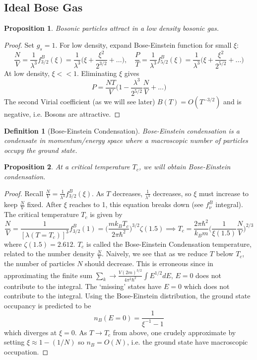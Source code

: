 \documentclass[a4paper]{article}
\theoremstyle{new}
\newtheorem{defi}{Definition}[section]
\newtheorem{prop}{Proposition}[section]
\begin{document}
\subsection{Ideal Bose Gas}
\begin{prop}
Bosonic particles attract in a low density bosonic gas.
\end{prop}
\begin{proof}
Set $g_s=1$. For low density, expand Bose-Einstein function for small $\xi$:
$$\frac{N}{V}=\frac{1}{\lambda^3}f_{3/2}^B(\xi)=\frac{1}{\lambda^3}\bigg(\xi+\frac{\xi^2}{2^{3/2}}+...\bigg),\quad \frac{P}{T}=\frac{1}{\lambda^3}f_{5/2}^B(\xi)=\frac{1}{\lambda^3}\bigg(\xi+\frac{\xi^2}{2^{5/2}}+...\bigg)$$
At low density, $\xi<<1$. Eliminating $\xi$ gives
$$P=\frac{NT}{V}\bigg(1-\frac{\lambda^3}{2^{5/2}}\frac{N}{V}+...\bigg)$$
The second Virial coefficient (as we will see later) $B(T)=O(T^{-3/2})$ and is negative, i.e. Bosons are attractive.
\end{proof}
\begin{defi}[Bose-Einstein Condensation]
Bose-Einstein condensation is a condensate in momentum/energy space where a macroscopic number of particles occupy the ground state.
\end{defi}
\begin{prop}
At a critical temperature $T_c$, we will obtain Bose-Einstein condensation.
\end{prop}
\begin{proof}
Recall $\frac{N}{V}=\frac{1}{\lambda^3}f_{3/2}^B(\xi)$. As $T$ decreases, $\frac{1}{\lambda^3}$ decreases, so $\xi$ must increase to keep $\frac{N}{V}$ fixed. After $\xi$ reaches to 1, this equation breaks down (see $f_\nu^B$ integral). The critical temperature $T_c$ is given by
$$\frac{N}{V}=\frac{1}{[\lambda(T=T_c)]^3}f_{3/2}^B(1)=\bigg(\frac{mk_BT_c}{2\pi\hbar^2}\bigg)^{3/2}\zeta(1.5)\implies T_c=\frac{2\pi\hbar^2}{k_Bm}\bigg(\frac{1}{\xi(1.5)}\frac{N}{V}\bigg)^{2/3}$$
where $\zeta(1.5)=2.612$. $T_c$ is called the Bose-Einstein Condensation temperature, related to the number density $\frac{N}{V}$. Naively, we see that as we reduce $T$ below $T_c$, the number of particles $N$ should decrease. This is erroneous since in approximating the finite sum $\sum_k\rightarrow\frac{V(2m)^{3/2}}{4\pi^2\hbar^2}\int E^{1/2}dE$, $E=0$ does not contribute to the integral. The `missing' states have $E=0$ which does not contribute to the integral. Using the Bose-Einstein distribution, the ground state occupancy is predicted to be
$$n_B(E=0)=\frac{1}{\xi^{-1}-1}$$
which diverges at $\xi=0$. As $T\rightarrow T_c$ from above, one crudely approximate by setting $\xi\approx1-(1/N)$ so $n_B=O(N)$, i.e. the ground state have macroscopic occupation. 
\end{proof}
\end{document}
